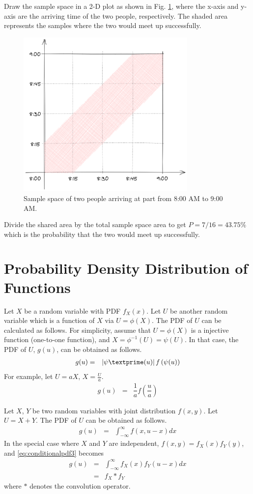 Draw the sample space in a 2-D plot as shown in Fig. \ref{fig:geometricprobexp}, where the x-axis and y-axis are the arriving time of the two people, respectively. The shaded area represents the samples where the two would meet up successfully.
\begin{figure}
	\centering
	\includegraphics[width=250pt]{chapters/ch-random-variables/figures/geometricprobexp.png}
	\caption{Sample space of two people arriving at part from 8:00 AM to 9:00 AM.} \label{fig:geometricprobexp}
\end{figure}
Divide the shared area by the total sample space area to get $P=7/16=43.75\%$ which is the probability that the two would meet up successfully. 



\section{Probability Density Distribution of Functions}

Let $X$ be a random variable with PDF $f_X(x)$. Let $U$ be another random variable which is a function of $X$ via $U=\phi(X)$. The PDF of $U$ can be calculated as follows. For simplicity, assume that $U=\phi(X)$ is a injective function (one-to-one function), and $X=\phi^{-1}(U)=\psi(U)$. In that case, the PDF of $U$, $g(u)$, can be obtained as follows.
\begin{eqnarray}
  g(u) &=& \left|\psi\textprime(u)\right|f\left(\psi(u)\right) \nonumber
\end{eqnarray}
For example, let $U=aX$, $X=\frac{U}{a}$.
\begin{eqnarray}
  g(u) &=& \dfrac{1}{a}f\left(\dfrac{u}{a}\right) \nonumber
\end{eqnarray}

Let $X$, $Y$ be two random variables with joint distribution $f(x, y)$. Let $U=X+Y$. The PDF of $U$ can be obtained as follows.
\begin{eqnarray}
  g(u) &=& \int_{-\infty}^{\infty} f(x, u-x)dx \label{eq:conditionalpdf3}
\end{eqnarray}
In the special case where $X$ and $Y$ are independent, $f(x, y) = f_X(x)f_Y(y)$, and \eqref{eq:conditionalpdf3} becomes
\begin{eqnarray}
  g(u) &=& \int_{-\infty}^{\infty} f_X(x)f_Y(u-x)dx \nonumber \\
  &=& f_X * f_Y \nonumber
\end{eqnarray}
where $*$ denotes the convolution operator.
